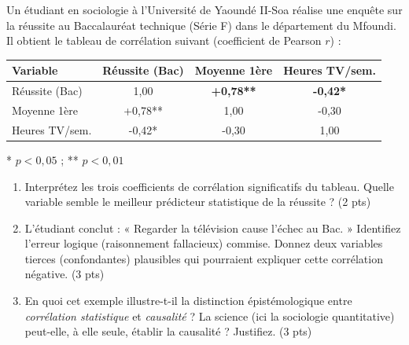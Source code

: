 \documentclass[11pt]{article}
\begin{document}
\begin{exercice}
Un étudiant en sociologie à l'Université de Yaoundé II-Soa réalise une enquête sur la réussite au Baccalauréat technique (Série F) dans le département du Mfoundi. Il obtient le tableau de corrélation suivant (coefficient de Pearson $r$) :
\begin{center}
\begin{tabular}{|l|c|c|c|}
\hline
\textbf{Variable} & \textbf{Réussite (Bac)} & \textbf{Moyenne 1ère} & \textbf{Heures TV/sem.} \\
\hline
Réussite (Bac) & 1,00 & \textbf{+0,78**} & \textbf{-0,42*} \\
Moyenne 1ère & +0,78** & 1,00 & -0,30 \\
Heures TV/sem. & -0,42* & -0,30 & 1,00 \\
\hline
\end{tabular}
\end{center}
\footnotesize{* $p<0,05$ ; ** $p<0,01$}
\normalsize
\begin{enumerate}
    \item Interprétez les trois coefficients de corrélation significatifs du tableau. Quelle variable semble le meilleur prédicteur statistique de la réussite ? (2 pts)
    \item L'étudiant conclut : « Regarder la télévision cause l'échec au Bac. » Identifiez l'erreur logique (raisonnement fallacieux) commise. Donnez deux variables tierces (confondantes) plausibles qui pourraient expliquer cette corrélation négative. (3 pts)
    \item En quoi cet exemple illustre-t-il la distinction épistémologique entre \textit{corrélation statistique} et \textit{causalité} ? La science (ici la sociologie quantitative) peut-elle, à elle seule, établir la causalité ? Justifiez. (3 pts)
\end{enumerate}
\end{exercice}
\end{document}
